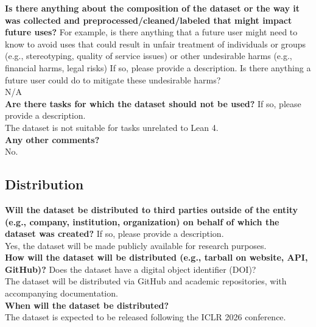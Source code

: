     \textcolor{\sectioncolor}{\textbf{Is there anything about the composition of the dataset or the way it was
    collected and preprocessed/cleaned/labeled that might impact future uses?
    }
    For example, is there anything that a future user might need to know to
    avoid uses that could result in unfair treatment of individuals or groups
    (e.g., stereotyping, quality of service issues) or other undesirable harms
    (e.g., financial harms, legal risks) If so, please provide a description.
    Is there anything a future user could do to mitigate these undesirable
    harms?
    } \\
    N/A \\

    \textcolor{\sectioncolor}{\textbf{Are there tasks for which the dataset should not be used?
    }
    If so, please provide a description.
    } \\
    The dataset is not suitable for tasks unrelated to Lean 4. \\

    \textcolor{\sectioncolor}{\textbf{Any other comments?
    }} \\
    No. \\

\subsection{Distribution}

    \textcolor{\sectioncolor}{\textbf{Will the dataset be distributed to third parties outside of the entity
    (e.g., company, institution, organization) on behalf of which the dataset
    was created?
    }
    If so, please provide a description.
    } \\
    Yes, the dataset will be made publicly available for research purposes. \\

    \textcolor{\sectioncolor}{\textbf{How will the dataset will be distributed (e.g., tarball on website, API,
    GitHub)?
    }
    Does the dataset have a digital object identifier (DOI)?
    } \\
    The dataset will be distributed via GitHub and academic repositories, with accompanying documentation. \\

    \textcolor{\sectioncolor}{\textbf{When will the dataset be distributed?
    }
    } \\
    The dataset is expected to be released following the ICLR 2026 conference. \\

